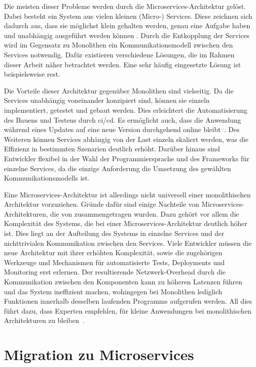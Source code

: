 Die meisten dieser Probleme werden durch die Microservices-Architektur gelöst.
Dabei besteht ein System aus vielen kleinen (Micro-) Services.
Diese zeichnen sich dadurch aus, dass sie möglichst klein gehalten werden, genau eine Aufgabe haben und unabhängig ausgeführt werden können \cite{10220070}.
Durch die Entkopplung der Services wird im Gegensatz zu Monolithen ein Kommunikationsmodell zwischen den Services notwendig.
Dafür existieren verschiedene Lösungen, die im Rahmen dieser Arbeit näher betrachtet werden.
Eine sehr häufig eingesetzte Lösung ist beispielsweise \gls{rest}.

Die Vorteile dieser Architektur gegenüber Monolithen sind vielseitig.
Da die Services unabhängig voneinander konzipiert sind, können sie einzeln implementiert, getestet und gebaut werden.
Dies erleichtert die Automatisierung des Bauens und Testens durch \gls{ci}/\gls{cd}.
Es ermöglicht auch, dass die Anwendung während eines Updates auf eine neue Version durchgehend online bleibt~\cite{10220070}. 
Des Weiteren können Services abhängig von der Last einzeln skaliert werden, was die Effizienz in bestimmten Szenarien deutlich erhöht.
Darüber hinaus sind Entwickler flexibel in der Wahl der Programmiersprache und des Frameworks für einzelne Services, da die einzige Anforderung die Umsetzung des gewählten Kommunikationsmodells ist.

Eine Microservices-Architektur ist allerdings nicht universell einer monolithischen Architektur vorzuziehen.
Gründe dafür sind einige Nachteile von Microservices-Architekturen, die von  zusammengetragen wurden.
Dazu gehört vor allem die Komplexität des Systems, die bei einer Microservices-Architektur deutlich höher ist.
Dies liegt an der Aufteilung des Systems in einzelne Services und der nichttrivialen Kommunikation zwischen den Services.
Viele Entwickler müssen die neue Architektur mit ihrer erhöhten Komplexität, sowie die zugehörigen Werkzeuge und Mechanismen für automatisierte Tests, Deployments und Monitoring erst erlernen.
Der resultierende Netzwerk-Overhead durch die Kommunikation zwischen den Komponenten kann zu höheren Latenzen führen und das System ineffizient machen, wohingegen bei Monolithen lediglich Funktionen innerhalb desselben laufenden Programms aufgerufen werden.
All dies führt dazu, dass Experten empfehlen, für kleine Anwendungen bei monolithischen Architekturen zu bleiben~\cite{10220070}\cite{7742218}.

\section{Migration zu Microservices}

